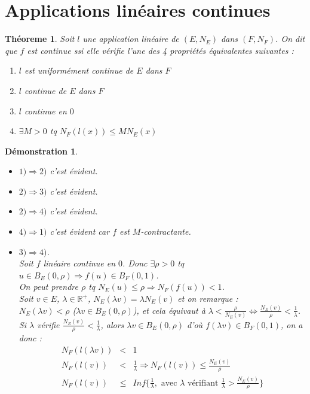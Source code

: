 \documentclass[a4paper, oneside]{report}
\theoremstyle{break}
\newtheorem{thm}{Théoreme}[section] %
\newtheorem*{demo}{Démonstration}
\newcommand{\R}{\mathbb{R}}
\newcommand{\unifcont}{uniformément continue }
\newcommand{\fracun}[1]{\frac{1}{#1}}
\begin{document}
\section{Applications linéaires continues}

\begin{thm}
Soit $l$ une application linéaire de $(E,N_E)$ dans $(F,N_F)$.
On dit que $f$ est continue ssi elle vérifie l'une des 4 propriétés équivalentes suivantes :
\begin{enumerate}
\item $l$ est \unifcont de $E$ dans $F$
\item $l$ continue de $E$ dans $F$
\item $l$ continue en $0$
\item $\exists M >0$ tq $N_F(l(x))\leq MN_E(x)$
\end{enumerate}

\end{thm}

\begin{demo}
\begin{itemize}
\item $1) \Rightarrow 2)$ c'est évident.
\item $2) \Rightarrow 3)$ c'est évident.
\item $2) \Rightarrow 4)$ c'est évident.
\item $4) \Rightarrow 1)$ c'est évident car $f$ est $M$-contractante.
\item $3) \Rightarrow 4)$.\\
Soit $f$ linéaire continue en $0$. Donc $\exists \rho > 0$ tq $u\in B_E(0,\rho)\Rightarrow f(u)\in B_F(0,1)$.\\
On peut prendre $\rho$ tq $N_E(u)\leq \rho \Rightarrow N_F(f(u))<1$.\\
Soit $v\in E$, $\lambda\in \R^+$, $N_E(\lambda v)=\lambda N_E(v)$ et on remarque :\\
$N_E(\lambda v)<\rho$ ($\lambda v \in B_E(0,\rho)$), et cela équivaut à $\lambda < \frac{\rho}{N_E(v)} \Leftrightarrow \frac{N_E(v)}{\rho}<\fracun{\lambda}$.\\
Si $\lambda$ vérifie $\frac{N_E(v)}{\rho}<\fracun{\lambda}$, alors $\lambda v\in B_E(0,\rho)$ d'où $f(\lambda v)\in B_F(0,1)$, on a donc :
$$\begin{array}{lll}
N_F(l(\lambda v))&<& 1\\
N_F(l(v))&<&\fracun{\lambda}\Rightarrow N_F(l(v))\leq \frac{N_E(v)}{\rho}\\
N_F(l(v)) &\leq& Inf\{\fracun{\lambda},\text{ avec }\lambda \text{ vérifiant } \fracun{\lambda}>\frac{N_E(v)}{\rho} \}
\end{array}$$
\end{itemize}
\end{demo}
\end{document}
